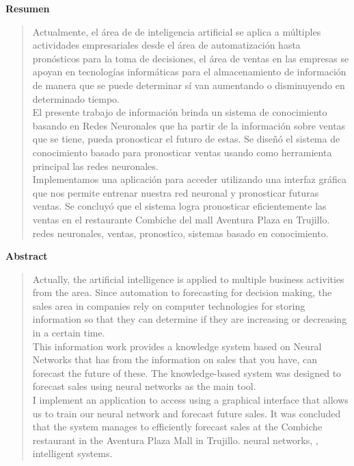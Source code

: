 \newpage
\begin{center}
 {\bf\LARGE Resumen}
\end{center} 
\vskip 0.5cm
\begin{quotation}
Actualmente, el área de de inteligencia artificial se aplica a múltiples actividades empresariales desde el área
de automatización hasta pronósticos para la toma de decisiones, el área de ventas en las empresas se apoyan en tecnologías informáticas para el almacenamiento de información de manera que se puede
determinar sí van aumentando o disminuyendo en determinado tiempo.\\
El presente trabajo de información brinda un sistema de conocimiento basando en Redes Neuronales que ha partir de la información sobre ventas que se tiene, pueda pronosticar el futuro de estas. Se diseñó el sistema de conocimiento basado para pronosticar ventas usando como herramienta principal las redes neuronales. \\
Implementamos una aplicación para acceder utilizando una interfaz gráfica que nos permite entrenar nuestra red neuronal y pronosticar futuras ventas. Se concluyó que el sistema logra pronosticar eficientemente las ventas en el restaurante Combiche del mall Aventura Plaza en Trujillo.
\vskip 0.3cm
\hspace*{-0.6cm}{\bf Palabras claves:} redes neuronales, ventas, pronostico, sistemas basado en conocimiento.
\end{quotation}


\newpage
\begin{center}
 {\bf\LARGE Abstract}\vskip 1.5cm
\end{center} 
\begin{quotation}
Actually, the artificial intelligence is applied to multiple business activities from the area. Since automation to forecasting for decision making, the sales area in companies rely on computer technologies for storing information so that they can determine if they are increasing or decreasing in a certain time.\\
This information work provides a knowledge system based on Neural Networks that has from the information on sales that you have, can forecast the future of these. The knowledge-based system was designed to forecast sales using neural networks as the main tool.\\
I implement an application to access using a graphical interface that allows us to train our neural network and forecast future sales. It was concluded that the system manages to efficiently forecast sales at the Combiche restaurant in the Aventura Plaza Mall in Trujillo.
\vskip 0.3cm
\hspace*{-0.6cm}{\bf Keywords:} neural networks, , intelligent systems.
\end{quotation}


